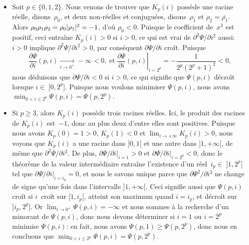 \begin{itemize}

\item Soit \(p \in \{0,1,2\}\). Nous venons de trouver que \(K_p(i)\)
  possède une racine réelle, disons~\(\rho_0\), et deux non-réelles et
  conjuguées, disons~\(\rho_1\) et \(\rho_2=\overline{\rho_1}\). Alors
  \(\rho_0\rho_1\rho_2 = \rho_0 \lvert{\rho_1}\rvert{}^2 = -1\), d'où \(\rho_0 <
  0\). Puisque le coefficient de~\(x^3\) est positif, ceci entraîne
  \(K_p(i) > 0\) si \(i > 0\), ce qui est vrai de
  \(\partial^2\Psi/\partial i^2\) aussi: \(i > 0 \) implique
  \(\partial^2\Psi/\partial i^2 > 0\), par conséquent
  \(\partial\Psi/\partial i\) croît. Puisque
  \begin{equation*}
    \frac{\partial\Psi}{\partial i}(p,i) \xrightarrow[i\to 0^{+}]{}
    -\infty < 0, \;\text{et}\; \left.\frac{\partial\Psi}{\partial
        i}(p,i)\right|_{i=2^p} = -\frac{1}{2^p(2^p+1)^2} < 0,
  \end{equation*}
  nous déduisons que \(\partial\Psi/\partial i < 0\) si \(i > 0\), ce
  qui signifie que \(\Psi(p,i)\) décroît lorsque \(i \in\;
  ]0,2^p]\). Puisque nous voulons minimiser \(\Psi(p,i)\), nous avons
  \(\min_{0 < i \leqslant 2^p}\Psi(p,i) = \Psi(p,2^p)\).

\item Si \(p \geqslant 3\), alors \(K_p(i)\) possède trois racines
  réelles. Ici, le produit des racines de \(K_p(i)\) est~\(-1\), donc
  au plus deux d'entre elles sont positives. Puisque nous avons
  \(K_p(0) = 1 > 0\), \(K_p(1) < 0\) et \(\lim_{i\to+\infty}K_p(i) >
  0\), nous voyons que \(K_p(i)\) a une racine dans \(]0,1[\) et une
  autre dans \(]1,+\infty[\), de même que \(\partial^2\Psi/\partial
  i^2\). De plus, \(\left.\partial\Psi/\partial i\right|_{i=1} > 0\)
  et \(\left.\partial\Psi/\partial i\right|_{i=2^p} < 0\), donc le
  théorème de la valeur intermédiaire entraîne l'existence d'un
  réel~\(i_p \in\; ]1,2^p[\) tel que \(\left.\partial\Psi/\partial
    i\right|_{i=i_p} = 0\), et nous le savons unique parce que
  \(\partial\Psi^2/\partial i^2\) ne change de signe qu'une fois dans
  l'intervalle \(]1,+\infty[\). Ceci signifie aussi que \(\Psi(p,i)\)
  croît si \(i\)~croît sur \([1,i_p[\), atteint son maximum quand
  \(i=i_p\), et décroît sur \(]i_p,2^p]\). Or \(\lim_{i \to
    0^{+}}\Psi(p,i) = -\infty\) et nous sommes à la recherche d'un
  minorant de \(\Psi(p,i)\), donc nous devons déterminer si \(i=1\) ou
  \(i=2^p\) minimise \(\Psi(p,i)\): en fait, nous avons \(\Psi(p,1)
  \geqslant \Psi(p,2^p)\), donc nous en concluons que \(\min_{0 < i
    \leqslant 2^p}\Psi(p,i) = \Psi(p,2^p)\).
\end{itemize}
